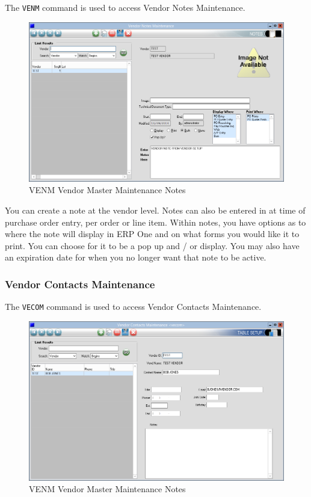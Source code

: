 
The \texttt{VENM} command is used to access Vendor Notes Maintenance.

\begin{figure}[H]
	\includegraphics[width=\textwidth]{../img/image73}
	\caption{VENM Vendor Master Maintenance Notes}
\end{figure}

You can create a note at the vendor level. Notes can also be entered in at time of purchase order entry, per order or line item. Within notes, you have options as to where the note will display in ERP One and on what forms you would like it to print. You can choose for it to be a pop up and / or display. You may also have an expiration date for when you no longer want that note to be active.

\subsubsection{Vendor Contacts Maintenance}


The \texttt{VECOM} command is used to access Vendor Contacts Maintenance.

\begin{figure}[H]
	\includegraphics[width=\textwidth]{../img/image74}
	\caption{VENM Vendor Master Maintenance Notes}
\end{figure}

